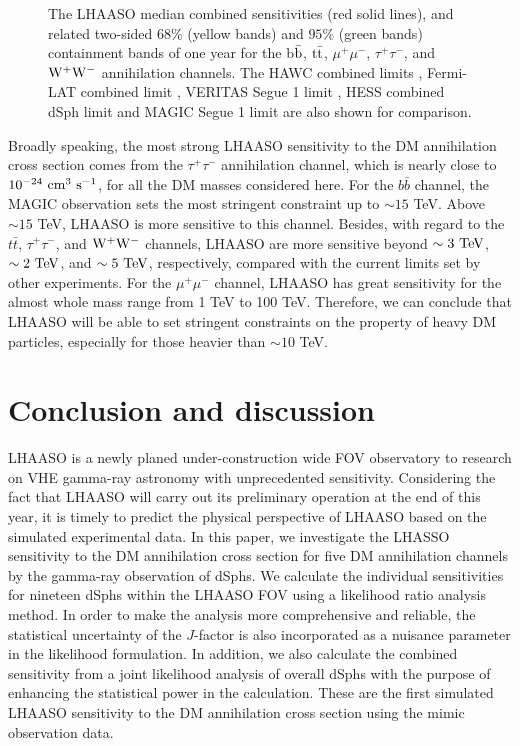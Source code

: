\documentclass[12pt,aps,prd,amsmath,amssymb,showpacs,floats,floatfix,nofootinbib]{revtex4-1}
\begin{document}
\begin{figure}
\caption{The LHAASO median combined sensitivities (red solid lines), and related two-sided $68\%$ (yellow bands) and $95\%$ (green bands) containment bands of one year for the b$\bar{\rm b}$, $\rm t\bar{\rm t}$, $\mu^{+}\mu^{-}$, $\tau^+\tau^-$, and $\rm W^+W^-$ annihilation channels. The HAWC combined limits \cite{Albert:2017vtb}, Fermi-LAT combined limit \cite{Ackermann:2013yva}, VERITAS Segue 1 limit \cite{Aliu:2012ga}, HESS combined dSph limit \cite{Abramowski:2014tra} and MAGIC Segue 1 limit \cite{Ahnen:2016qkx} are also shown for comparison. }
\label{fig:Lhaaso-combined}
\end{figure}

Broadly speaking, the most strong LHAASO sensitivity to the DM annihilation cross section comes from the $\tau^{+}\tau^{-}$ annihilation channel, which is nearly close to $10^{-24}~\rm cm^{3}~s^{-1}$, for all the DM masses considered here. For the $b\bar{b}$ channel, the MAGIC observation sets the most stringent constraint up to $\sim15$ TeV. Above $\sim15$ TeV, LHAASO is more sensitive to this channel. Besides, with regard to the $t\bar{t}$, $\tau^+\tau^-$, and $\rm W^+W^-$ channels, LHAASO are more sensitive beyond $\sim3 ~\rm TeV$, $\sim2 ~\rm TeV$, and $\sim 5 ~\rm TeV$, respectively, compared with the current limits set by other experiments.
For the $\mu^{+}\mu^{-}$ channel, LHAASO has great sensitivity for the almost whole mass range from 1 TeV to 100 TeV. Therefore, we can conclude that LHAASO will be able to set stringent constraints on the property of heavy DM particles, especially for those heavier than $\sim 10$ TeV.

\section{Conclusion and discussion}\label{sec:conclu}
LHAASO is a newly planed under-construction wide FOV observatory to research on VHE gamma-ray astronomy with unprecedented sensitivity. Considering the fact that LHAASO will carry out its preliminary operation at the end of this year, it is timely to predict the physical perspective of LHAASO based on the simulated experimental data.
In this paper, we investigate the LHASSO sensitivity to the DM annihilation cross section for five DM annihilation channels by the gamma-ray observation of dSphs. We calculate the individual sensitivities for nineteen dSphs within the LHAASO FOV using a likelihood ratio analysis method. In order to make the analysis more comprehensive and reliable, the statistical uncertainty of the $J$-factor is also incorporated as a nuisance parameter in the likelihood formulation.
In addition, we also calculate the combined sensitivity from a joint likelihood analysis of overall dSphs with the purpose of enhancing the statistical power in the calculation. These are the first simulated LHAASO sensitivity to the DM annihilation cross section using the mimic observation data.
\end{document}
